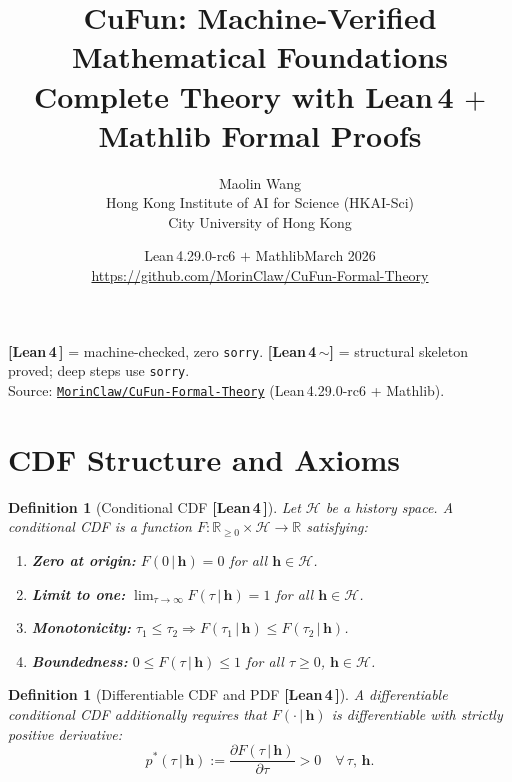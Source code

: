 \documentclass[11pt]{article}
\title{\textbf{CuFun: Machine-Verified Mathematical Foundations}\\[4pt]
\large Complete Theory with Lean\,4 $+$ Mathlib Formal Proofs}
\author{Maolin Wang \\
\small Hong Kong Institute of AI for Science (HKAI-Sci) \\
\small City University of Hong Kong}
\date{Lean\,4.29.0-rc6 $+$ Mathlib\quad March 2026 \\[2pt]
\small\url{https://github.com/MorinClaw/CuFun-Formal-Theory}}
\newtheorem{definition}[theorem]{Definition}
\theoremstyle{remark}
\newcommand{\verified}{%
  \textcolor{green!60!black}{\textbf{[Lean\,4\,\checkmark]}}}
\newcommand{\partverified}{%
  \textcolor{orange!80!black}{\textbf{[Lean\,4\,$\sim$]}}}
\newcommand{\R}{\mathbb{R}}
\newcommand{\cH}{\mathcal{H}}
\newcommand{\hhat}{\boldsymbol{h}}
\begin{document}
\maketitle

\begin{tcolorbox}[colback=green!5!white, colframe=green!50!black,
  title=Verification Legend]
\verified{} = machine-checked, zero \texttt{sorry}. \quad
\partverified{} = structural skeleton proved; deep steps use \texttt{sorry}. \\
Source: \href{https://github.com/MorinClaw/CuFun-Formal-Theory}{\texttt{MorinClaw/CuFun-Formal-Theory}} (Lean\,4.29.0-rc6 + Mathlib).
\end{tcolorbox}

\tableofcontents
\bigskip

\section{CDF Structure and Axioms}

\begin{definition}[Conditional CDF \verified{}]
\label{def:cdf}
Let $\cH$ be a history space.  A \emph{conditional CDF} is a function
$F : \R_{\geq 0} \times \cH \to \R$ satisfying:
\begin{enumerate}
  \item \textbf{Zero at origin:} $F(0\,|\,\hhat) = 0$ for all $\hhat \in \cH$.
  \item \textbf{Limit to one:} $\lim_{\tau\to\infty} F(\tau\,|\,\hhat) = 1$
    for all $\hhat \in \cH$.
  \item \textbf{Monotonicity:} $\tau_1 \leq \tau_2 \Rightarrow
    F(\tau_1\,|\,\hhat) \leq F(\tau_2\,|\,\hhat)$.
  \item \textbf{Boundedness:} $0 \leq F(\tau\,|\,\hhat) \leq 1$ for all
    $\tau \geq 0$, $\hhat \in \cH$.
\end{enumerate}
\end{definition}

\begin{definition}[Differentiable CDF and PDF \verified{}]
A \emph{differentiable conditional CDF} additionally requires that
$F(\cdot\,|\,\hhat)$ is differentiable with \emph{strictly positive} derivative:
\[
  p^*(\tau\,|\,\hhat)
  := \frac{\partial F(\tau\,|\,\hhat)}{\partial \tau} > 0
  \quad \forall\,\tau,\,\hhat.
\]
\end{definition}
\end{document}
